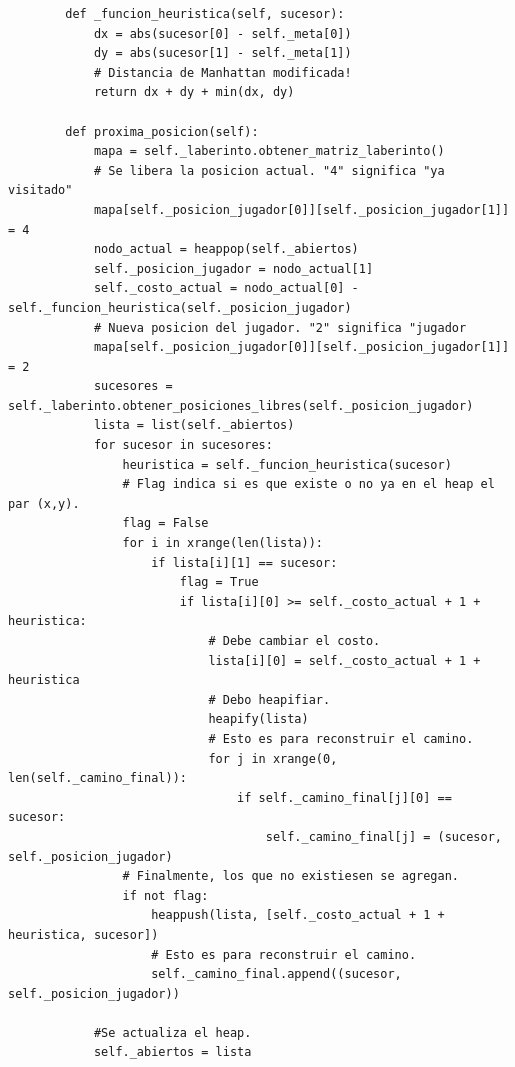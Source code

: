 \documentclass[letter, titlepage, 10pt]{article}
\begin{document}
\begin{lstlisting}
        def _funcion_heuristica(self, sucesor):
            dx = abs(sucesor[0] - self._meta[0])
            dy = abs(sucesor[1] - self._meta[1])
            # Distancia de Manhattan modificada!
            return dx + dy + min(dx, dy)
    
        def proxima_posicion(self):
            mapa = self._laberinto.obtener_matriz_laberinto()
            # Se libera la posicion actual. "4" significa "ya visitado"
            mapa[self._posicion_jugador[0]][self._posicion_jugador[1]] = 4
            nodo_actual = heappop(self._abiertos)
            self._posicion_jugador = nodo_actual[1]
            self._costo_actual = nodo_actual[0] - self._funcion_heuristica(self._posicion_jugador)
            # Nueva posicion del jugador. "2" significa "jugador
            mapa[self._posicion_jugador[0]][self._posicion_jugador[1]] = 2
            sucesores = self._laberinto.obtener_posiciones_libres(self._posicion_jugador)
            lista = list(self._abiertos)
            for sucesor in sucesores:
                heuristica = self._funcion_heuristica(sucesor)
                # Flag indica si es que existe o no ya en el heap el par (x,y).
                flag = False
                for i in xrange(len(lista)):
                    if lista[i][1] == sucesor:
                        flag = True
                        if lista[i][0] >= self._costo_actual + 1 + heuristica:
                            # Debe cambiar el costo.
                            lista[i][0] = self._costo_actual + 1 + heuristica
                            # Debo heapifiar.
                            heapify(lista)
                            # Esto es para reconstruir el camino.
                            for j in xrange(0, len(self._camino_final)):
                                if self._camino_final[j][0] == sucesor:
                                    self._camino_final[j] = (sucesor, self._posicion_jugador)
                # Finalmente, los que no existiesen se agregan.
                if not flag:
                    heappush(lista, [self._costo_actual + 1 + heuristica, sucesor])
                    # Esto es para reconstruir el camino.
                    self._camino_final.append((sucesor, self._posicion_jugador))
    
            #Se actualiza el heap.
            self._abiertos = lista
\end{lstlisting}
\end{document}
